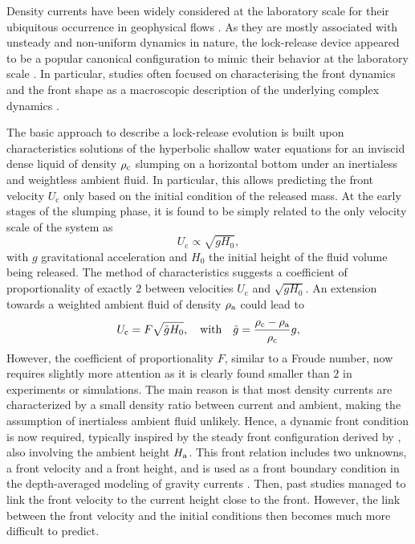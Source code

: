 \documentclass[12pt]{article}
\begin{document}
Density currents have been widely considered at the laboratory scale for their ubiquitous occurrence in geophysical flows \citep{Hopfinger1983,Simpson1999,Dufek2016}. As they are mostly associated with unsteady and non-uniform dynamics in nature, the lock-release device appeared to be a popular canonical configuration to mimic their behavior at the laboratory scale \citep{Hacker1996,Shin2004,Nogueira2014}. In particular, studies often focused on characterising the front dynamics and the front shape as a macroscopic description of the underlying complex dynamics \citep{Rottman1983,Marino2005,Hogg2006}.

The basic approach to describe a lock-release evolution is built upon characteristics solutions of the hyperbolic shallow water equations for an inviscid dense liquid of density $\rho_{\text c}$ slumping on a horizontal bottom under an inertialess and weightless ambient fluid. In particular, this allows predicting the front velocity $U_{\text{c}}$ only based on the initial condition of the released mass. At the early stages of the slumping phase, it is found to be simply related to the only velocity scale of the system as
\begin{equation}
	U_{\text{c}}\propto \sqrt{gH_0},
\end{equation}
with $g$ gravitational acceleration and $H_0$ the initial height of the fluid volume being released. The method of characteristics suggests a coefficient of proportionality of exactly $2$ between velocities $U_{\text{c}}$ and $\sqrt{g H_0}$. An extension towards a weighted ambient fluid of density $\rho_{\text a}$ could lead to
\begin{equation}
	\label{eq:solUc}
	U_{\text{c}}=F\sqrt{\tilde{g}H_0},\quad\mbox{with}\quad \tilde{g}=\frac{\rho_{\text c}-\rho_{\text a}}{\rho_{\text c}}g,
\end{equation}
However, the coefficient of proportionality $F$, similar to a Froude number, now requires slightly more attention as it is clearly found smaller than $2$ in experiments or simulations. The main reason is that most density currents are characterized by a small density ratio between current and ambient, making the assumption of inertialess ambient fluid unlikely. 
%
Hence, a dynamic front condition is now required, typically inspired by the steady front configuration derived by \citet{Benjamin1968}, also involving the ambient height $H_{\text a}$. This front relation includes two unknowns, a front velocity and a front height, and is used as a front boundary condition in the depth-averaged modeling of gravity currents \cite[e.g.][]{ungarish2020gravity}. Then, past studies managed to link the front velocity to the current height close to the front. However, the link between the front velocity and the initial conditions then becomes much more difficult to predict.
\end{document}
